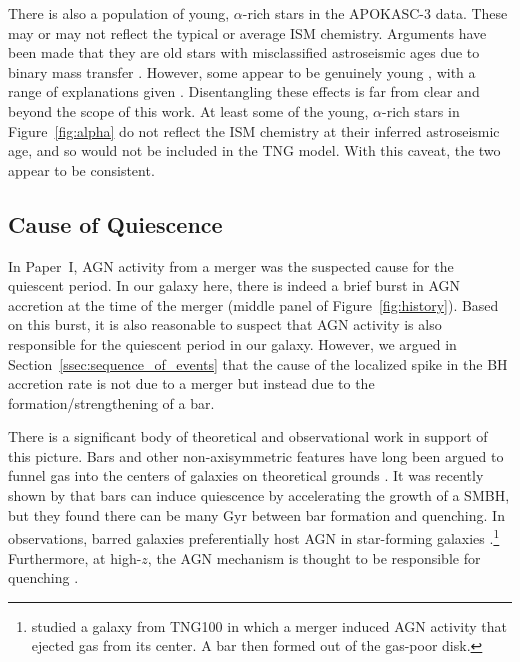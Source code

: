 \documentclass[twocolumn,linenumbers]{aastex631}
\begin{document}
There is also a population of young, $\alpha$-rich stars in the APOKASC-3 data. These may or may not reflect the typical or average ISM chemistry. Arguments have been made that they are old stars with misclassified astroseismic ages due to binary mass transfer \citep[and references therein]{2023A&A...671A..21J}. However, some appear to be genuinely young \citep[and references therein]{2024arXiv241002962L}, with a range of explanations given \citep[e.g.][]{2015A&A...576L..12C,2021MNRAS.508.4484J,2023arXiv231105815S}. Disentangling these effects is far from clear and beyond the scope of this work. At least some of the young, $\alpha$-rich stars in Figure~\ref{fig:alpha} do not reflect the ISM chemistry at their inferred astroseismic age, and so would not be included in the TNG model. With this caveat, the two appear to be consistent.

\subsection{Cause of Quiescence}\label{ssec:cause_qui}
In Paper~I, AGN activity from a merger was the suspected cause for the quiescent period. In our galaxy here, there is indeed a brief burst in AGN accretion at the time of the merger (middle panel of Figure~\ref{fig:history}). Based on this burst, it is also reasonable to suspect that AGN activity is also responsible for the quiescent period in our galaxy. However, we argued in Section~\ref{ssec:sequence_of_events} that the cause of the localized spike in the BH accretion rate is not due to a merger but instead due to the formation/strengthening of a bar.

There is a significant body of theoretical and observational work in support of this picture. Bars and other non-axisymmetric features have long been argued to funnel gas into the centers of galaxies on theoretical grounds \citep{1989Natur.338...45S,2010MNRAS.407.1529H}. It was recently shown by \citet{2024arXiv240906783F} that bars can induce quiescence by accelerating the growth of a SMBH, but they found there can be many Gyr between bar formation and quenching. In observations, barred galaxies preferentially host AGN in star-forming galaxies \citep{2012ApJS..198....4O,2022A&A...661A.105S}.\footnote{\citet{2022A&A...668L...3L} studied a galaxy from TNG100 in which a merger induced AGN activity that ejected gas from its center. A bar then formed out of the gas-poor disk.} Furthermore, at high-$z$, the AGN mechanism is thought to be responsible for quenching \citep[e.g.][and references therein]{2023arXiv230806317D,2024arXiv240417945P,2024arXiv240518685M,2024Natur.630...54B}.
\end{document}
